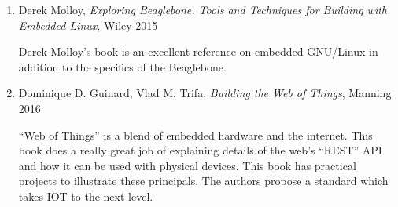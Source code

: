 \begin{enumerate}
\item Derek Molloy, \emph{Exploring Beaglebone, Tools and Techniques for 
Building 
with Embedded Linux}, Wiley 2015

Derek Molloy's book is an excellent reference on embedded GNU/Linux in 
addition 
to the specifics of the Beaglebone.

\item Dominique D. Guinard, Vlad M. Trifa, \emph{Building the Web of Things}, 
Manning 
2016

``Web of Things'' is a blend of embedded hardware and the 
internet.  This book does a really great job of explaining details of the web's 
``REST'' API and how it can be used with physical devices.
This book has practical projects to illustrate these principals.  The authors 
propose a standard which takes IOT to the next level.

\end{enumerate}
